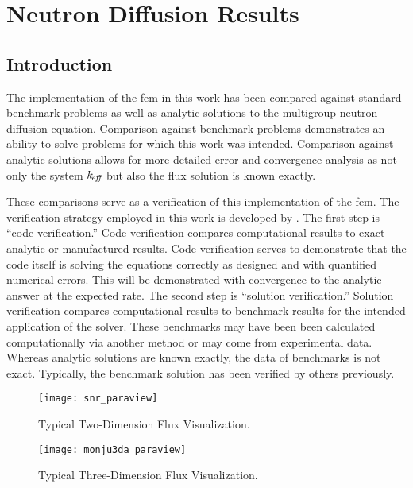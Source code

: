 \chapter{Neutron Diffusion Results}
\label{ch:diffusionResults}

\section{Introduction}
  The implementation of the \gls{fem} in this work has been compared
  against standard benchmark problems as well as analytic solutions to the
  multigroup neutron diffusion equation. Comparison against benchmark problems
  demonstrates an ability to solve problems for which this work was intended.
  Comparison against analytic solutions allows for more detailed error and
  convergence analysis as not only the system $k_{\!\mbox{\scriptsize \em eff}}$ but also the flux solution
  is known exactly. 

  These comparisons serve as a verification of this implementation of the
  \gls{fem}. The verification strategy employed in this work is developed by
  \textcite{oberkampf}. The first step is ``code verification.'' Code
  verification compares computational results to exact analytic or manufactured
  results. Code verification serves to demonstrate that the code itself is
  solving the equations correctly as designed and with quantified numerical
  errors. This will be demonstrated with convergence to the analytic answer at
  the expected rate. The second step is ``solution verification.'' Solution
  verification compares computational results to benchmark results for the
  intended application of the solver. These benchmarks may have been been
  calculated computationally via another method or may come from experimental
  data. Whereas analytic solutions are known exactly, the data of benchmarks is 
  not exact. Typically, the benchmark solution has been verified by others 
  previously.

  \begin{figure}
    \centering
    \texttt{[image: snr\_paraview]}
    \caption{Typical Two-Dimension Flux Visualization.}
    \label{fig:snr_paraview}
  \end{figure}

  \begin{figure}
    \centering
    \texttt{[image: monju3da\_paraview]}
    \caption{Typical Three-Dimension Flux Visualization.}
    \label{fig:monju3da_paraview}
  \end{figure}

